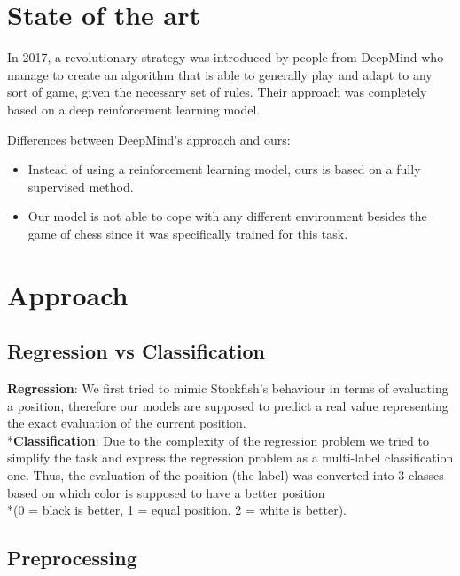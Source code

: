 \documentclass[runningheads,a4paper,11pt]{report}
\begin{document}
\chapter{State of the art}
\label{chapter:stateOfArt}


In 2017, a revolutionary strategy was introduced by people from DeepMind who manage to create an algorithm that is able to generally play and adapt to any sort of game, given the necessary set of rules. Their approach was completely based on a deep reinforcement learning model.

Differences between DeepMind's approach and ours:
\begin{itemize}
	 \item Instead of using a reinforcement learning model, ours is based on a fully supervised method.
	 \item Our model is not able to cope with any different environment besides the game of chess since it was specifically trained for this task. 
\end{itemize}

\chapter{Approach}

    \section{Regression vs Classification}
    \textbf{Regression}: We first tried to mimic Stockfish's behaviour in terms of evaluating a position, therefore our models are supposed to predict a real value representing the exact evaluation of the current position.
    \\*\textbf{Classification}: Due to the complexity of the regression problem we tried to simplify the task and express the regression problem as a multi-label classification one. Thus, the evaluation of the position (the label) was converted into 3 classes based on which color is supposed to have a better position \\*(0 = black is better, 1 = equal position, 2 = white is better). 


    \section{Preprocessing}
    
\end{document}
